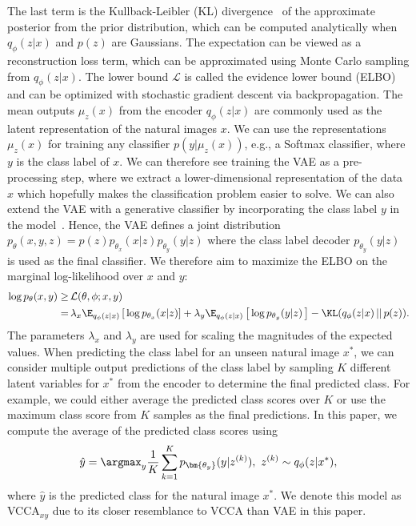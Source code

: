 The last term is the Kullback-Leibler (KL) divergence~\cite{kullback1951information} of the approximate posterior from the prior distribution, which can be computed analytically when $q_{\phi}(z|x)$ and $p(z)$ are Gaussians. The expectation can be viewed as a reconstruction loss term, which can be approximated using Monte Carlo sampling from $q_{\phi}(z|x)$. The lower bound $\mathcal{L}$ is called the evidence lower bound (ELBO) and can be optimized with stochastic gradient descent via backpropagation. The mean outputs $\mu_{z}(x)$ from the encoder $q_{\phi}(z|x)$ are commonly used as the latent representation of the natural images $x$. We can use the representations
$\mu_{z}(x)$ for training any classifier $p(y | \mu_{z}(x))$, e.g., a Softmax classifier, where $y$ is the class label of $x$. We can therefore see training the VAE as a pre-processing step, where we extract a lower-dimensional representation of the data $x$ which hopefully makes the classification problem easier to solve. 
We can also extend the VAE with a generative classifier by incorporating the class label $y$ in the model~\cite{li2019generative, ma2018eddi}. 
Hence, the VAE defines a joint distribution $p_{\theta}(x, y, z) = p(z) p_{\theta_{x}}(x|z) p_{\theta_{y}}(y|z)$ where the class label decoder $p_{\theta_{y}}(y|z)$ is used as the final classifier. 
We therefore aim to maximize the ELBO on the marginal log-likelihood over $x$ and $y$: 
\begin{align}\label{eq:loss_vcca_xy}
    \begin{split}
        \log p_{\theta}(x, y) \geq & \, \mathcal{L}(\theta, \phi; x, y) \\ 
        = & \,  \lambda_{x} \E_{q_{\phi}(z|x)}\left[\, \log p_{\theta_{x}}(x | z) \right] + \lambda_{y} \E_{q_{\phi}(z|x)}\left[\, \log p_{\theta_{y}}(y | z) \,\right] - \KL(q_{\phi}(z|x)\,||\,p(z)) .
    \end{split}
\end{align}  
The parameters $\lambda_{x}$ and $\lambda_{y}$ are used for scaling the magnitudes of the expected values. When predicting the class label for an unseen natural image $x^{*}$, we can consider multiple output predictions of the class label by sampling $K$ different latent variables for $x^{*}$ from the encoder to determine the final predicted class. For example, we could either average the predicted class scores over $K$ or use the maximum class score from $K$ samples as the final predictions. In this paper, we compute the average of the predicted class scores using
\begin{align}\label{eq:prediction_vcca_xy}
    \hat{y} = \argmax_{y} \frac{1}{K} \sum_{k=1}^{K} p_{\bm{\theta_{y}}}(y | z^{(k)}), \,\, z^{(k)} \sim q_{\phi}(z | x^{*}) ,
\end{align}
where $\hat{y}$ is the predicted class for the natural image $x^{*}$. We denote this model as VCCA$_{x y}$ due to its closer resemblance to VCCA than VAE in this paper.


